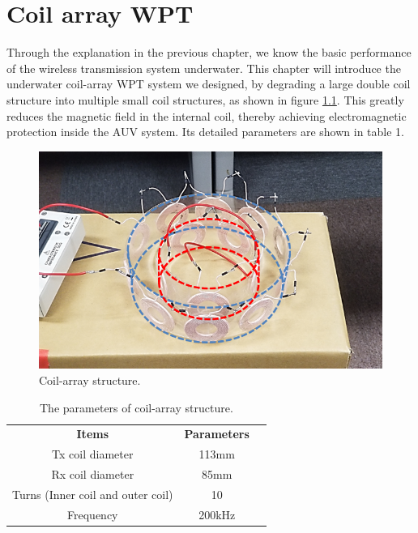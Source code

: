 \chapter{Coil array WPT}
Through the explanation in the previous chapter, we know the basic performance of the wireless transmission system underwater. This chapter will introduce the underwater coil-array WPT system we designed, by degrading a large double coil structure into multiple small coil structures, as shown in figure \ref{fig:3_coil_array_structure}. This greatly reduces the magnetic field in the internal coil, thereby achieving electromagnetic protection inside the AUV system. Its detailed parameters are shown in table 1.

\begin{figure}[htbp]
    \centering
    \includegraphics[width=0.7\linewidth]{images/3_coil_array_structure.png}
    \caption{Coil-array structure.}
    \label{fig:3_coil_array_structure}
\end{figure}

\begin{table}[htbp]
    \centering
    \caption{The parameters of coil-array structure.}
    \begin{tabular}{ c|cc }
        \thickhline
        \textbf{Items}                    & \textbf{Parameters}      \\
        \thickhline
      
        Tx coil diameter                  & 113mm                    \\ \hline
        Rx coil diameter                  & 85mm                     \\ \hline
        Turns (Inner coil and outer coil) & 10                       \\ \hline
        Frequency                         & 200kHz                   \\ \hline
    \end{tabular}
    \label{table: coil array parameters}
\end{table}

